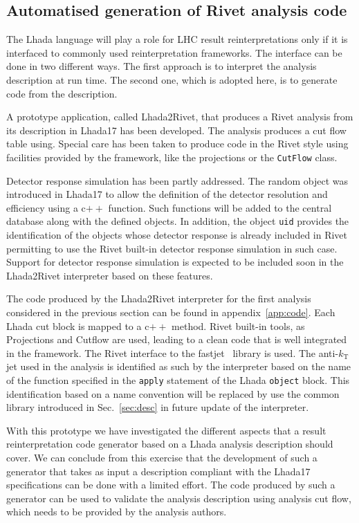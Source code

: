 \documentclass[11pt]{cernrep}
\begin{document}
\subsection{Automatised generation of Rivet analysis code}

The {\sc Lhada} language will play a role for LHC result reinterpretations only if it is interfaced to commonly used reinterpretation frameworks. The interface can be done in two different ways. The first approach is to interpret the analysis description at run time. The second one, which is adopted here, is to generate code from the description.

A prototype application, called {\sc Lhada2Rivet}, that produces a Rivet analysis from its description in {\sc Lhada17} has been developed. The analysis produces a cut flow table using. Special care has been taken to produce code in the {\sc Rivet} style using facilities provided by the framework, like the projections or the {\tt CutFlow} class.

Detector response simulation has been partly addressed. The random object was introduced in {\sc Lhada17} to allow the definition of  the detector resolution and efficiency using a c$++$ function.  Such functions will be added to the central database along with the defined objects. In addition, the object {\tt uid} provides the identification of the objects whose detector response is already included in {\sc Rivet} permitting to use the {\sc Rivet} built-in detector response simulation in such case. Support for detector response simulation is expected to be included soon in the {\sc Lhada2Rivet} interpreter based on these features.

The code produced by the {\sc Lhada2Rivet} interpreter for the first analysis considered in the previous section can be found in appendix~\ref{app:code}. Each {\sc Lhada} cut block is mapped to a c$++$ method. {\sc Rivet} built-in tools, as Projections and Cutflow are used, leading to a clean code that is well integrated in the framework. The {\sc Rivet} interface to the fastjet~\cite{Cacciari:2011ma} library is used. The anti-$k_{\text{T}}$ jet used in the analysis is identified as such by the interpreter based on the name of the function specified in the {\tt apply} statement of the {\sc Lhada} {\tt object} block. This identification based on a name convention will be replaced by use the common library introduced in Sec.~\ref{sec:desc} in future update of the interpreter.

With this prototype we have investigated the different aspects that a result reinterpretation code generator based on a {\sc Lhada} analysis description should cover. We can conclude from this exercise that the development of such a generator that takes as input a description compliant with the {\sc Lhada17} specifications can be done with a limited effort. The code produced by such a generator can be used to validate the analysis description using analysis cut flow, which needs to be provided by the analysis authors. 
\end{document}
